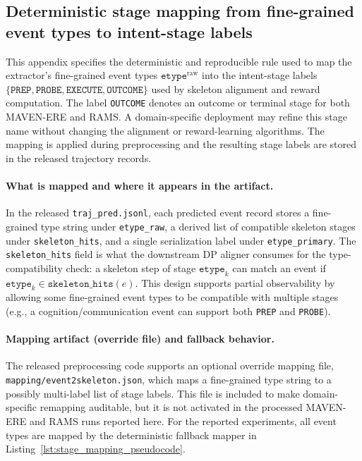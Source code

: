 \documentclass{article}
\begin{document}
\subsection{Deterministic stage mapping from fine-grained event types to intent-stage labels}
\label{sec:app_stage_mapping}

This appendix specifies the deterministic and reproducible rule used to map the extractor's fine-grained event types $\texttt{etype}^{\mathrm{raw}}$
into the intent-stage labels $\{\texttt{PREP},\texttt{PROBE},\texttt{EXECUTE},\texttt{OUTCOME}\}$ used by skeleton alignment and reward computation.
The label \texttt{OUTCOME} denotes an outcome or terminal stage for both MAVEN-ERE and RAMS.
A domain-specific deployment may refine this stage name without changing the alignment or reward-learning algorithms.
The mapping is applied during preprocessing and the resulting stage labels are stored in the released trajectory records.

\paragraph{What is mapped and where it appears in the artifact.}
In the released \texttt{traj\_pred.jsonl}, each predicted event record stores a fine-grained type string under \texttt{etype\_raw}, a derived list of compatible skeleton stages under \texttt{skeleton\_hits}, and a single serialization label under \texttt{etype\_primary}.
The \texttt{skeleton\_hits} field is what the downstream DP aligner consumes for the type-compatibility check: a skeleton step of stage $\texttt{etype}_k$ can match an event if $\texttt{etype}_k \in \texttt{skeleton\_hits}(e)$.
This design supports partial observability by allowing some fine-grained event types to be compatible with multiple stages (e.g., a cognition/communication event can support both \texttt{PREP} and \texttt{PROBE}).

\paragraph{Mapping artifact (override file) and fallback behavior.}
The released preprocessing code supports an optional override mapping file,
\texttt{mapping/event2skeleton.json}, which maps a fine-grained type string to a possibly multi-label list of stage labels.
This file is included to make domain-specific remapping auditable, but it is not activated in the processed MAVEN-ERE and RAMS runs reported here.
For the reported experiments, all event types are mapped by the deterministic fallback mapper in Listing~\ref{lst:stage_mapping_pseudocode}.
\end{document}
